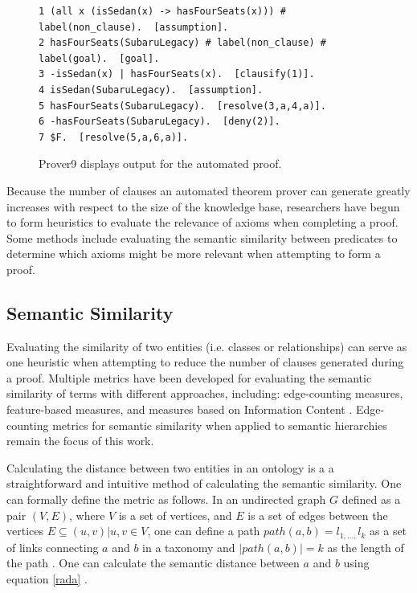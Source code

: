 \documentclass{article}
\begin{document}
\begin{figure}[h]
\begin{verbatim}
1 (all x (isSedan(x) -> hasFourSeats(x))) # label(non_clause).  [assumption].
2 hasFourSeats(SubaruLegacy) # label(non_clause) # label(goal).  [goal].
3 -isSedan(x) | hasFourSeats(x).  [clausify(1)].
4 isSedan(SubaruLegacy).  [assumption].
5 hasFourSeats(SubaruLegacy).  [resolve(3,a,4,a)].
6 -hasFourSeats(SubaruLegacy).  [deny(2)].
7 $F.  [resolve(5,a,6,a)].
\end{verbatim}
\caption{Prover9 displays output for the automated proof. }
\label{fig:prover9out}
\end{figure}

Because the number of clauses an automated theorem prover can generate greatly increases with respect to the size of the knowledge base, researchers have begun to form heuristics to evaluate the relevance of axioms when completing a proof. Some methods include evaluating the semantic similarity between predicates to determine which axioms might be more relevant when attempting to form a proof. 

\subsection{Semantic Similarity}
Evaluating the similarity of two entities (i.e. classes or relationships) can serve as one heuristic when attempting to reduce the number of clauses generated during a proof. Multiple metrics have been developed for evaluating the semantic similarity of terms with different approaches, including: edge-counting measures, feature-based measures, and measures based on Information Content \cite{sanchez2012ontology} \cite{rodriguez1999assessing} \cite{roederer2009divvy}.  Edge-counting metrics for semantic similarity when applied to semantic hierarchies remain the focus of this work. 

Calculating the distance between two entities in an ontology is a a straightforward and intuitive method of calculating the semantic similarity. One can formally define the metric as follows. In an undirected graph $G$ defined as a pair $(V,E)$, where $V$ is a set of vertices, and $E$ is a set of edges between the vertices $E \subseteq {(u,v) | u, v \in V}$, one can define a path $path(a,b)=l_{1,\dots ,}l_k$ as a set of links connecting $a$ and $b$ in a taxonomy and $\lvert path(a,b) \rvert = k$ as the length of the path \cite{sanchez2012ontology}. One can calculate the semantic distance between $a$ and $b$ using equation \ref{rada} \cite{rada1989development}.
\end{document}
